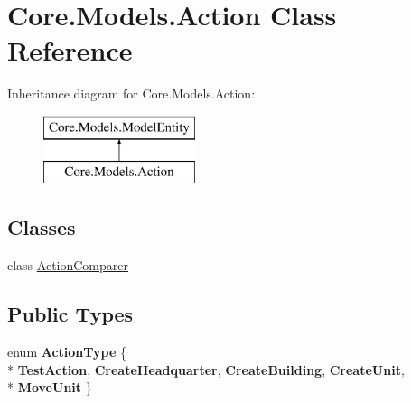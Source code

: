 \hypertarget{classCore_1_1Models_1_1Action}{\section{Core.\-Models.\-Action Class Reference}
\label{classCore_1_1Models_1_1Action}
}
Inheritance diagram for Core.\-Models.\-Action\-:\begin{figure}[H]
\begin{center}
\leavevmode
\includegraphics[height=2.000000cm]{classCore_1_1Models_1_1Action}
\end{center}
\end{figure}
\subsection*{Classes}
\begin{DoxyCompactItemize}
\item 
class \hyperlink{classCore_1_1Models_1_1Action_1_1ActionComparer}{Action\-Comparer}
\end{DoxyCompactItemize}
\subsection*{Public Types}
\begin{DoxyCompactItemize}
\item 
enum {\bfseries Action\-Type} \{ \\*
{\bfseries Test\-Action}, 
{\bfseries Create\-Headquarter}, 
{\bfseries Create\-Building}, 
{\bfseries Create\-Unit}, 
\\*
{\bfseries Move\-Unit}
 \}
\end{DoxyCompactItemize}
